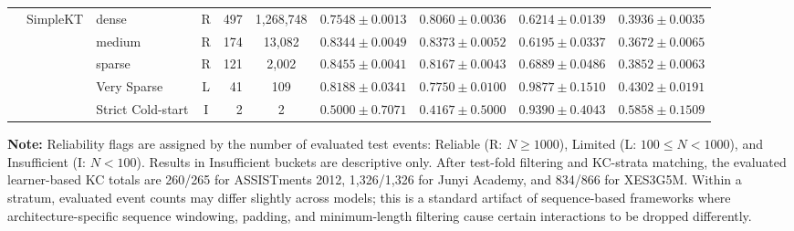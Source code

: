 \begin{table}[tbp]
{\begin{tabular}{lllcrccccc}
 & SimpleKT & dense & R & 497 & 1,268,748 & $0.7548 \pm 0.0013$ & $0.8060 \pm 0.0036$ & $0.6214 \pm 0.0139$ & $0.3936 \pm 0.0035$ \\
 &  & medium & R & 174 & 13,082 & $0.8344 \pm 0.0049$ & $0.8373 \pm 0.0052$ & $0.6195 \pm 0.0337$ & $0.3672 \pm 0.0065$ \\
 &  & sparse & R & 121 & 2,002 & $0.8455 \pm 0.0041$ & $0.8167 \pm 0.0043$ & $0.6889 \pm 0.0486$ & $0.3852 \pm 0.0063$ \\
 &  & Very Sparse & L & 41 & 109 & $0.8188 \pm 0.0341$ & $0.7750 \pm 0.0100$ & $0.9877 \pm 0.1510$ & $0.4302 \pm 0.0191$ \\
 &  & Strict Cold-start & I & 2 & 2 & $0.5000 \pm 0.7071$ & $0.4167 \pm 0.5000$ & $0.9390 \pm 0.4043$ & $0.5858 \pm 0.1509$ \\
\bottomrule

\end{tabular}%
}

\vspace{1ex}
{\scriptsize \textbf{Note:} Reliability flags are assigned by the number of evaluated test events: Reliable (R: $N \ge 1000$), Limited (L: $100 \le N < 1000$), and Insufficient (I: $N < 100$). Results in Insufficient buckets are descriptive only. After test-fold filtering and KC-strata matching, the evaluated learner-based KC totals are 260/265 for ASSISTments 2012, 1,326/1,326 for Junyi Academy, and 834/866 for XES3G5M. Within a stratum, evaluated event counts may differ slightly across models; this is a standard artifact of sequence-based frameworks where architecture-specific sequence windowing, padding, and minimum-length filtering cause certain interactions to be dropped differently.\par}

\end{table}
